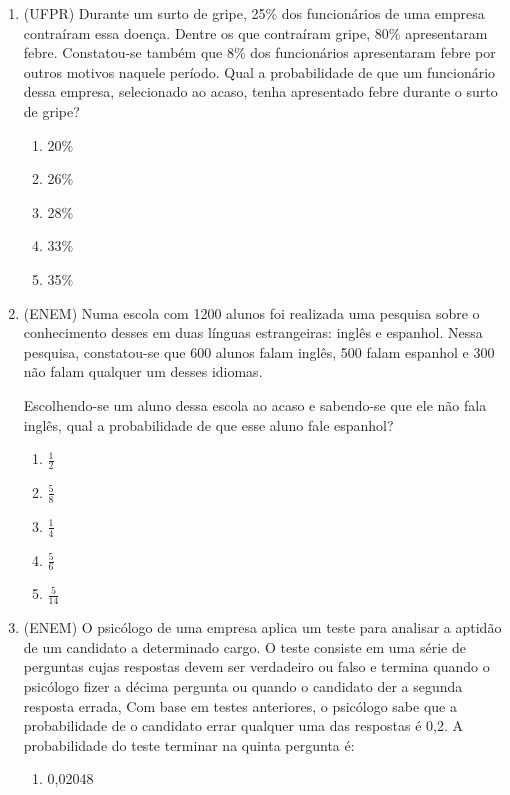 \begin{enumerate}
\begin{enumerate}
\end{enumerate}

\item (UFPR) Durante um surto de gripe, 25\% dos funcionários de uma empresa contraíram essa doença. Dentre os que contraíram gripe, 80\% apresentaram febre. Constatou-se também que 8\% dos funcionários apresentaram febre por outros motivos naquele período. Qual a probabilidade de que um funcionário dessa empresa, selecionado ao acaso, tenha apresentado febre durante o surto de gripe?
\begin{enumerate}
\item {} 
20\%

\item {} 
26\%

\item {} 
28\%

\item {} 
33\%

\item {} 
35\%

\end{enumerate}

\item (ENEM) Numa escola com 1200 alunos foi realizada uma pesquisa sobre o conhecimento desses em duas línguas estrangeiras: inglês e espanhol. Nessa pesquisa, constatou-se que 600 alunos falam inglês, 500 falam espanhol e 300 não falam qualquer um desses idiomas.

Escolhendo-se um aluno dessa escola ao acaso e sabendo-se que ele não fala inglês, qual a probabilidade de que esse aluno fale espanhol?
\begin{enumerate}
\item {} 
\(\frac{1}{2}\)

\item {} 
\(\frac{5}{8}\)

\item {} 
\(\frac{1}{4}\)

\item {} 
\(\frac{ 5}{6}\)

\item {} 
\(\frac{5}{14}\)

\end{enumerate}

\item (ENEM) O psicólogo de uma empresa aplica um teste para analisar a aptidão de um candidato a determinado cargo. O teste consiste em uma série de perguntas cujas respostas devem ser verdadeiro ou falso e termina quando o psicólogo fizer a décima pergunta ou quando o candidato der a segunda resposta errada, Com base em testes anteriores, o psicólogo sabe que a probabilidade de o candidato errar qualquer uma das respostas é 0,2. A probabilidade do teste terminar na quinta pergunta é:
\begin{enumerate}
\item {} 
0,02048


\end{enumerate}
\end{enumerate}
